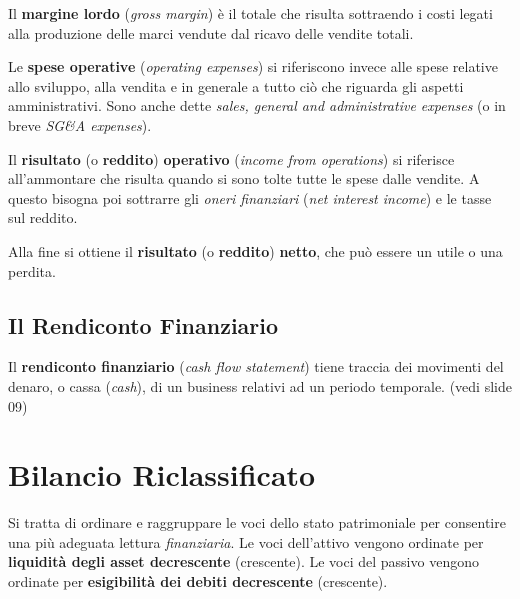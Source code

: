 \documentclass[a4paper,portrait,12pt]{article}
\theoremstyle{definition}
\begin{document}
Il \textbf{margine lordo} (\emph{gross margin}) è il totale che risulta sottraendo i costi legati alla produzione delle marci vendute dal ricavo delle vendite totali.

Le \textbf{spese operative} (\emph{operating expenses}) si riferiscono invece alle spese relative allo sviluppo, alla vendita e in generale a tutto ciò che riguarda gli aspetti amministrativi.
Sono anche dette \emph{sales, general and administrative expenses} (o in breve \emph{SG\&A expenses}).

Il \textbf{risultato} (o \textbf{reddito}) \textbf{operativo} (\emph{income from operations}) si riferisce all'ammontare che risulta quando si sono tolte tutte le spese dalle vendite.
A questo bisogna poi sottrarre gli \emph{oneri finanziari} (\emph{net interest income}) e le tasse sul reddito.

Alla fine si ottiene il \textbf{risultato} (o \textbf{reddito}) \textbf{netto}, che può essere un utile o una perdita.


\subsection{Il Rendiconto Finanziario}

Il \textbf{rendiconto finanziario} (\emph{cash flow statement}) tiene traccia dei movimenti del denaro, o cassa (\emph{cash}), di un business relativi ad un periodo temporale.
(vedi slide 09)


\newpage
\section{Bilancio Riclassificato}


Si tratta di ordinare e raggruppare le voci dello stato 
patrimoniale per consentire una più adeguata lettura 
\emph{finanziaria}.
Le voci dell’attivo vengono ordinate per \textbf{liquidità degli 
asset decrescente} (crescente).
Le voci del passivo vengono ordinate per \textbf{esigibilità 
dei debiti decrescente} (crescente).
\end{document}
